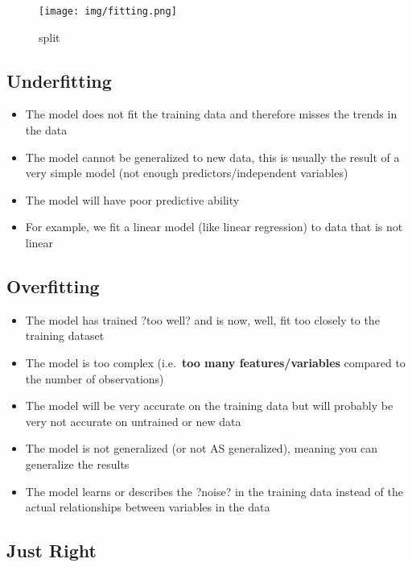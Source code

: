 \documentclass[
]{book}
\providecommand{\tightlist}{%
  \setlength{\itemsep}{0pt}\setlength{\parskip}{0pt}}
\begin{document}
\begin{figure}
\centering
\texttt{[image: img/fitting.png]}
\caption{split}
\end{figure}

\hypertarget{underfitting}{%
\subsection{Underfitting}\label{underfitting}}

\begin{itemize}
\tightlist
\item
  The model does not fit the training data and therefore misses the trends in the data
\item
  The model cannot be generalized to new data, this is usually the result of a very simple model (not enough predictors/independent variables)
\item
  The model will have poor predictive ability
\item
  For example, we fit a linear model (like linear regression) to data that is not linear
\end{itemize}

\hypertarget{overfitting}{%
\subsection{Overfitting}\label{overfitting}}

\begin{itemize}
\tightlist
\item
  The model has trained ?too well? and is now, well, fit too closely to the training dataset
\item
  The model is too complex (i.e.~\textbf{too many features/variables} compared to the number of observations)
\item
  The model will be very accurate on the training data but will probably be very not accurate on untrained or new data
\item
  The model is not generalized (or not AS generalized), meaning you can generalize the results
\item
  The model learns or describes the ?noise? in the training data instead of the actual relationships between variables in the data
\end{itemize}

\hypertarget{just-right}{%
\subsection{Just Right}\label{just-right}}
\end{document}
